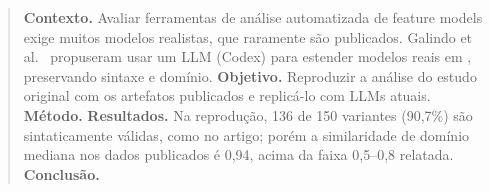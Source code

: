 \begin{abstract}
\textbf{Contexto.} Avaliar ferramentas de análise automatizada de feature models exige muitos modelos realistas, que raramente são publicados. Galindo et al.~\cite{galindo2023llm} propuseram usar um LLM (Codex) para estender modelos reais em \uvl{}, preservando sintaxe e domínio.
\textbf{Objetivo.} Reproduzir a análise do estudo original com os artefatos publicados e replicá-lo com LLMs atuais.
\textbf{Método.} 
\textbf{Resultados.} Na reprodução, 136 de 150 variantes (90,7\%) são sintaticamente válidas, como no artigo; porém a similaridade de domínio mediana nos dados publicados é 0,94, acima da faixa 0,5--0,8 relatada. 
\textbf{Conclusão.} \todo{}
\end{abstract}
